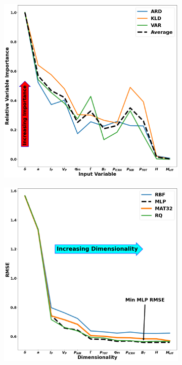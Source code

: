 \documentclass[a4paper, twoside, final, 12pt]{article}
\begin{document}
{\begin{figure}
	\begin{subfigure}{0.48\linewidth}
		\centering
		\includegraphics[scale=0.2]{ ./src/GP_sensitivity_analysis_final_v1}
				\caption{}
		\label{subfig:GP_sens}
	\end{subfigure}\hfill
	\begin{subfigure}{0.48\linewidth}
		\centering
		\includegraphics[scale=0.2]{ ./src/final_GP_dim_v2}

\end{subfigure}
\end{figure}}
\end{document}
